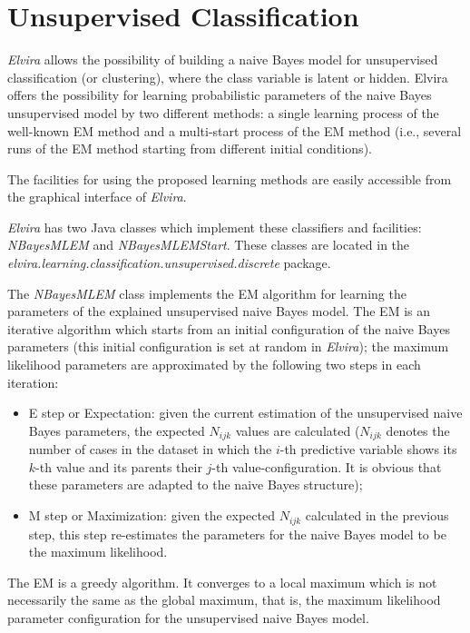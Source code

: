 \section{Unsupervised Classification}

{\em Elvira} allows the possibility of building a naive Bayes
model for unsupervised classification (or clustering), where the
class variable is latent or hidden. Elvira offers the possibility
for learning probabilistic parameters of the naive Bayes
unsupervised model by two different methods: a single learning
process of the well-known EM method \cite{dempster77,mclachlan97}
and a multi-start process of the EM method (i.e., several runs of
the EM method starting from different initial conditions).

The facilities for using the proposed learning methods are easily
accessible from the graphical interface of {\em Elvira}.

{\em Elvira} has two Java classes which implement these
classifiers and facilities: {\em NBayesMLEM} and {\em
NBayesMLEMStart}. These classes are located in the {\em
elvira.learning.classification.unsupervised.discrete} package.

The {\em NBayesMLEM} class implements the EM algorithm
\cite{dempster77,mclachlan97} for learning the parameters of the
explained unsupervised naive Bayes model. The EM is an iterative
algorithm which starts from an initial configuration of the naive
Bayes parameters (this initial configuration is set at random in
{\em Elvira}); the maximum likelihood parameters are approximated
by the following two steps in each iteration:
\begin{itemize}
\item E step or Expectation: given the current estimation of the
unsupervised naive Bayes parameters, the expected $N_{ijk}$ values
are calculated ($N_{ijk}$ denotes the number of cases in the
dataset in which the $i$-th predictive variable shows its $k$-th
value and its parents their $j$-th value-configuration. It is
obvious that these parameters are adapted to the naive Bayes
structure); \item M step or Maximization: given the expected
$N_{ijk}$ calculated in the previous step, this step re-estimates
the parameters for the naive Bayes model to be the maximum
likelihood.
\end{itemize}

The EM is a greedy algorithm. It converges to a local maximum
which is not necessarily the same as the global maximum, that is,
the maximum likelihood parameter configuration for the
unsupervised naive Bayes model.

